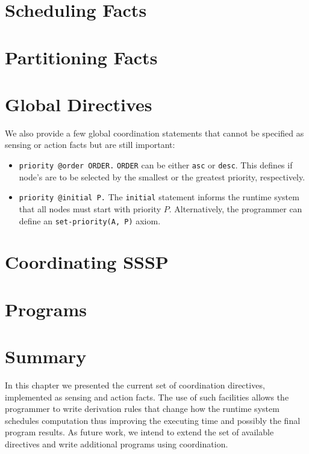

\section{Scheduling Facts}\label{sec:fifo}



\section{Partitioning Facts}



\section{Global Directives}

We also provide a few global coordination statements that cannot be specified
as sensing or action facts but are still important:

\begin{itemize}

   \item \texttt{priority @order ORDER.} \texttt{ORDER} can be either
      \texttt{asc} or \texttt{desc}. This defines if node's are to be selected
      by the smallest or the greatest priority, respectively.

   \item \texttt{priority @initial P.} The \texttt{initial} statement informs
      the runtime system that all nodes must start with priority $P$.
      Alternatively, the programmer can define an \texttt{set-priority(A, P)}
      axiom.

\end{itemize}

\section{Coordinating SSSP}



\section{Programs}



\section{Summary}

In this chapter we presented the current set of coordination directives,
implemented as sensing and action facts. The use of such facilities allows the
programmer to write derivation rules that change how the runtime system
schedules computation thus improving the executing time and possibly the final
program results. As future work, we intend to extend the set of available
directives and write additional programs using coordination.
